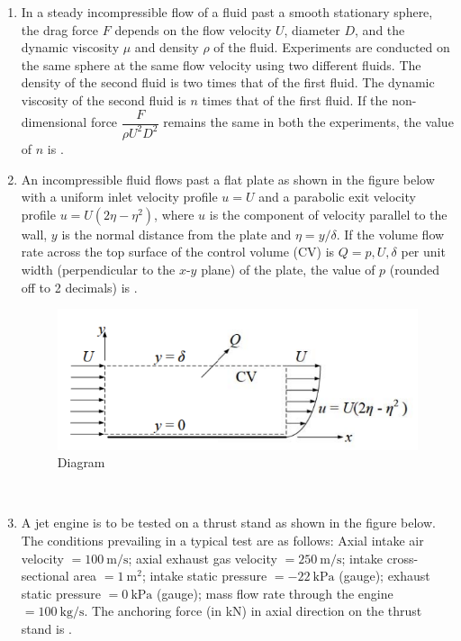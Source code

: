 \documentclass[journal,12pt,onecolumn]{IEEEtran}
\begin{document}
\begin{enumerate}[label=\arabic*)]
\vspace{0.5cm}

\item In a steady incompressible flow of a fluid past a smooth stationary sphere, the drag force $F$ depends on the flow velocity $U$, diameter $D$, and the dynamic viscosity $\mu$ and density $\rho$ of the fluid. Experiments are conducted on the same sphere at the same flow velocity using two different fluids. The density of the second fluid is two times that of the first fluid. The dynamic viscosity of the second fluid is $n$ times that of the first fluid. If the non-dimensional force $\dfrac{F}{\rho U^2 D^2}$ remains the same in both the experiments, the value of $n$ is \underline{\hspace{2cm}}.
\hfill{} \\

\vspace{0.5cm}

\item An incompressible fluid flows past a flat plate as shown in the figure below with a uniform inlet velocity profile $u=U$ and a parabolic exit velocity profile $u=U(2\eta - \eta^2)$, where $u$ is the component of velocity parallel to the wall, $y$ is the normal distance from the plate and $\eta=y/\delta$. If the volume flow rate across the top surface of the control volume (CV) is $Q=p,U,\delta$ per unit width (perpendicular to the $x$-$y$ plane) of the plate, the value of $p$ (rounded off to 2 decimals) is \underline{\hspace{2cm}}.

\begin{figure}[htbp]
  \centering
  \includegraphics[width=.7\linewidth]{figs/B/fig4.png}
  \caption{Diagram}
  \label{B/fig4}
\end{figure}
\hfill{} \\

\newpage

\item A jet engine is to be tested on a thrust stand as shown in the figure below. The conditions prevailing in a typical test are as follows: Axial intake air velocity $=100\ \mathrm{m/s}$; axial exhaust gas velocity $=250\ \mathrm{m/s}$; intake cross-sectional area $=1\ \mathrm{m^2}$; intake static pressure $=-22\ \mathrm{kPa}$ (gauge); exhaust static pressure $=0\ \mathrm{kPa}$ (gauge); mass flow rate through the engine $=100\ \mathrm{kg/s}$. The anchoring force (in kN) in axial direction on the thrust stand is \underline{\hspace{2cm}}.


\end{enumerate}
\end{document}
